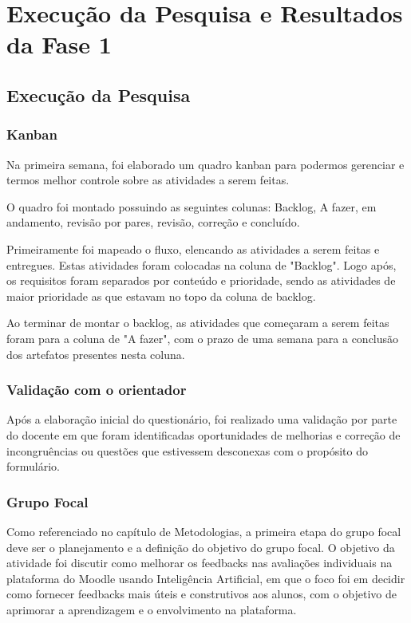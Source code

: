 \chapter{Execução da Pesquisa e Resultados da Fase 1}

\section{Execução da Pesquisa}

\subsection{Kanban}

Na primeira semana, foi elaborado um quadro kanban para podermos gerenciar e termos melhor controle sobre as atividades a serem feitas.

O quadro foi montado possuindo as seguintes colunas: Backlog, A fazer, em andamento, revisão por pares, revisão, correção e concluído.

Primeiramente foi mapeado o fluxo, elencando as atividades a serem feitas e entregues. Estas atividades foram colocadas na coluna de "Backlog". Logo após, os requisitos foram separados por conteúdo e prioridade, sendo as atividades de maior prioridade as que estavam no topo da coluna de backlog.

Ao terminar de montar o backlog, as atividades que começaram a serem feitas foram para a coluna de "A fazer", com o prazo de uma semana para a conclusão dos artefatos presentes nesta coluna.

\subsection{Validação com o orientador}

Após a elaboração inicial do questionário, foi realizado uma validação por parte do docente em que foram identificadas oportunidades de melhorias e correção de incongruências ou questões que estivessem desconexas com o propósito do formulário.

\subsection{Grupo Focal}

Como referenciado no capítulo de Metodologias, a primeira etapa do grupo focal deve ser o planejamento e a definição do objetivo do grupo focal. O objetivo da atividade foi discutir como melhorar os feedbacks nas avaliações individuais na plataforma do Moodle usando Inteligência Artificial, em que o foco foi em decidir como fornecer feedbacks mais úteis e construtivos aos alunos, com o objetivo de aprimorar a aprendizagem e o envolvimento na plataforma.


